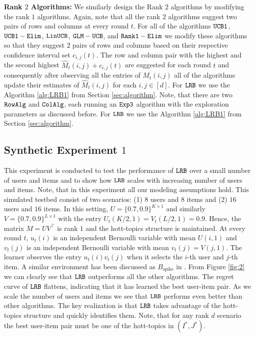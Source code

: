 \textbf{Rank $2$ Algorithms:} We similarly design the Rank $2$ algorithms by modifying the rank $1$ algorithms. Again, note that all the rank $2$ algorithms suggest two pairs of rows and columns at every round $t$. For all of the algorithms ${\tt UCB1}$, ${\tt UCB1-Elim}$, ${\tt LinUCB}$, $\tt GLM-UCB$, and $\tt Rank1-Elim$ we modify these algorithms so that they suggest $2$ pairs of rows and columns based on their respective confidence interval set $c_{i, j}(t)$. The row and column pair with the highest and the second highest $\hat{M}_{t}(i,j) + c_{i, j}(t)$ are suggested for each round $t$ and consequently after observing all the entries of $M_t(i,j)$ all of the algorithms update their estimates of $\hat{M}_{t}(i,j)$ for each $i,j \in [d]$. For ${\tt LRB}$ we use the Algorithm \ref{alg:LRB1} from Section \ref{sec:algorithm}. Note, that there are two ${\tt RowAlg}$ and ${\tt ColAlg}$, each running an ${\tt Exp3}$ algorithm with the  exploration parameters as discussed before. For ${\tt LRB}$ we use the Algorithm \ref{alg:LRB1} from Section \ref{sec:algorithm}. 

\subsection{Synthetic Experiment $1$}
This experiment is conducted to test the performance of ${\tt LRB}$ over a small number of users and items and to show how ${\tt LRB}$ scales with increasing number of users and items. Note, that in this experiment all our modeling assumptions hold. This simulated testbed consist of two scenarios: (1) $8$ users and $8$ items and (2) $16$ users and $16$ items. In this setting, $U = \{0.7, 0.9\}^{K\times 1}$ and similarly $V = \{0.7, 0.9\}^{L\times 1}$ with the entry $U_t(K/2,1) = V_t(L/2,1) = 0.9$. Hence, the matrix $M = UV^{\intercal}$ is rank $1$ and the hott-topics structure is maintained. At every round $t$, $u_t(i)$ is an independent Bernoulli variable with mean $U(i,1)$ and $v_t(j)$ is an independent Bernoulli variable with mean $v_t(j) = V(j,1)$. The learner observes the entry $u_t(i)v_t(j)$ when it selects the $i$-th user and $j$-th item. A similar environment has been discussed as $B_{\text{spike}}$ in \citep{katariya2016stochastic}. From Figure \ref{fig:2} we can clearly see that ${\tt LRB}$ outperforms all the other algorithms. The regret curve of ${\tt LRB}$ flattens, indicating that it has learned the best user-item pair. As we scale the number of users and items we see that ${\tt LRB}$ performs even better than other algorithms. The key realization is that ${\tt LRB}$ takes advantage of the hott-topics structure and quickly identifies them. Note, that for any rank $d$ scenario the best user-item pair must be one of the hott-topics in $(I^*, J^*)$.

